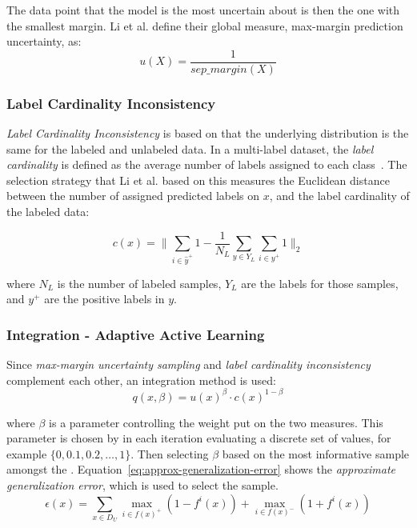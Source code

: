 The data point that the model is the most uncertain about is then the one with the smallest margin.
Li et al\@. define their global measure, max-margin prediction uncertainty, as:
\begin{equation}
    u(X) = \frac{1}{sep\_margin(X)}
\end{equation}

\subsubsection{Label Cardinality Inconsistency}

\textit{Label Cardinality Inconsistency} is based on that the underlying distribution is the same for the labeled and unlabeled data.
In a multi-label dataset, the \textit{label cardinality} is defined as the average number of labels assigned to each class~\cite{tsoumakas2006multi}.
The selection strategy that Li et al\@. based on this measures the Euclidean distance between the number of assigned predicted labels on $x$, and the label cardinality of the labeled data:

\begin{equation}
    c(x) = \bigg \lVert \sum_{i \in \hat{y}^+} 1 - \frac{1}{N_L} \sum_{y \in Y_L} \sum_{i \in y^+} 1 \bigg \rVert_2
\end{equation}

where $N_L$ is the number of labeled samples, $Y_L$ are the labels for those samples, and $y^+$ are the positive labels in $y$.

\subsubsection{Integration - Adaptive Active Learning}

Since \textit{max-margin uncertainty sampling} and \textit{label cardinality inconsistency} complement each other, an integration method is used:
\begin{equation}\label{eq:approx-generalization-error}
    q(x, \beta) = u(x)^\beta \cdot c(x)^{1-\beta}
\end{equation}

where $\beta$ is a parameter controlling the weight put on the two measures.
This parameter is chosen by in each iteration evaluating a discrete set of values, for example $\{0, 0.1, 0.2, \dots, 1\}$.
Then selecting $\beta$ based on the most informative sample amongst the .
Equation~\ref{eq:approx-generalization-error} shows the \textit{approximate generalization error}, which is used to select the sample.
\begin{equation}
    \epsilon(x) = \sum_{x \in D_U} \max_{i \in f(x)^+}(1-f^i(x)) + \max_{i \in f(x)^-}(1+f^i(x))
\end{equation}

